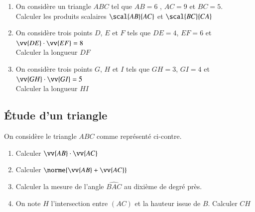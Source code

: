 \documentclass[oneside,12pt]{article}          %
\begin{document}
\begin{enumerate}
    \item On considère un triangle $ABC$ tel que $AB=6$ ,  $AC=9$ et $BC=5$.\\
    Calculer les produits scalaires $\scal{AB}{AC}$ et $\scal{BC}{CA}$
    \item On considère trois points $D$, $E$ et $F$ tels que $DE=4$, $EF=6$ et $\vv{DE}\cdot\vv{EF}=8$\\
    Calculer la longueur $DF$
    \item On considère trois points $G$, $H$ et $I$ tels que $GH=3$, $GI=4$ et $\vv{GH}\cdot\vv{GI}=5$\\
    Calculer la longueur $HI$
\end{enumerate}



\subsection{Étude d'un triangle}

\begin{minipage}{0.35\linewidth}
\end{minipage}%
\begin{minipage}{0.65\linewidth}
    On considère le triangle $ABC$ comme représenté ci-contre.
    \begin{enumerate}
        \item Calculer $\vv{AB}\cdot\vv{AC}$
        \item Calculer $\norme{\vv{AB}+\vv{AC}}$
        \item Calculer la mesure de l'angle $\widehat{BAC}$ au dixième de degré près.
        \item On note $H$ l'intersection entre $(AC)$ et la hauteur issue de $B$. Calculer $CH$
    \end{enumerate}
\end{minipage}
\end{document}
